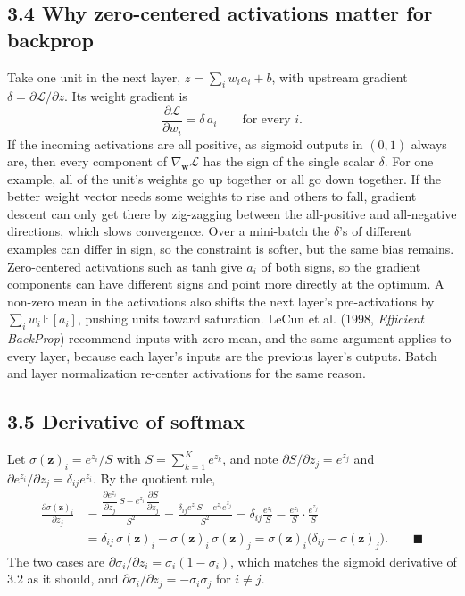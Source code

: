 \documentclass[11pt]{article}
\begin{document}
\subsection*{3.4 Why zero-centered activations matter for backprop}
Take one unit in the next layer, $z = \sum_i w_i a_i + b$, with upstream gradient $\delta = \partial\mathcal{L}/\partial z$. Its weight gradient is
\[
\frac{\partial\mathcal{L}}{\partial w_i} = \delta\, a_i \qquad\text{for every } i.
\]
If the incoming activations are all positive, as sigmoid outputs in $(0,1)$ always are, then every component of $\nabla_{\mathbf{w}}\mathcal{L}$ has the sign of the single scalar $\delta$. For one example, all of the unit's weights go up together or all go down together. If the better weight vector needs some weights to rise and others to fall, gradient descent can only get there by zig-zagging between the all-positive and all-negative directions, which slows convergence. Over a mini-batch the $\delta$'s of different examples can differ in sign, so the constraint is softer, but the same bias remains. Zero-centered activations such as tanh give $a_i$ of both signs, so the gradient components can have different signs and point more directly at the optimum. A non-zero mean in the activations also shifts the next layer's pre-activations by $\sum_i w_i\,\mathbb{E}[a_i]$, pushing units toward saturation. LeCun et al. (1998, \emph{Efficient BackProp}) recommend inputs with zero mean, and the same argument applies to every layer, because each layer's inputs are the previous layer's outputs. Batch and layer normalization re-center activations for the same reason.

\subsection*{3.5 Derivative of softmax}
Let $\sigma(\mathbf{z})_i = e^{z_i}/S$ with $S = \sum_{k=1}^K e^{z_k}$, and note $\partial S/\partial z_j = e^{z_j}$ and $\partial e^{z_i}/\partial z_j = \delta_{ij}e^{z_i}$. By the quotient rule,
\begin{align*}
\frac{\partial\sigma(\mathbf{z})_i}{\partial z_j}
&= \frac{\dfrac{\partial e^{z_i}}{\partial z_j}\,S - e^{z_i}\,\dfrac{\partial S}{\partial z_j}}{S^2}
= \frac{\delta_{ij}e^{z_i}S - e^{z_i}e^{z_j}}{S^2}
= \delta_{ij}\frac{e^{z_i}}{S} - \frac{e^{z_i}}{S}\cdot\frac{e^{z_j}}{S}\\[4pt]
&= \delta_{ij}\,\sigma(\mathbf{z})_i - \sigma(\mathbf{z})_i\,\sigma(\mathbf{z})_j
= \sigma(\mathbf{z})_i\big(\delta_{ij} - \sigma(\mathbf{z})_j\big). \qquad\blacksquare
\end{align*}
The two cases are $\partial\sigma_i/\partial z_i = \sigma_i(1-\sigma_i)$, which matches the sigmoid derivative of 3.2 as it should, and $\partial\sigma_i/\partial z_j = -\sigma_i\sigma_j$ for $i\ne j$.
\end{document}
